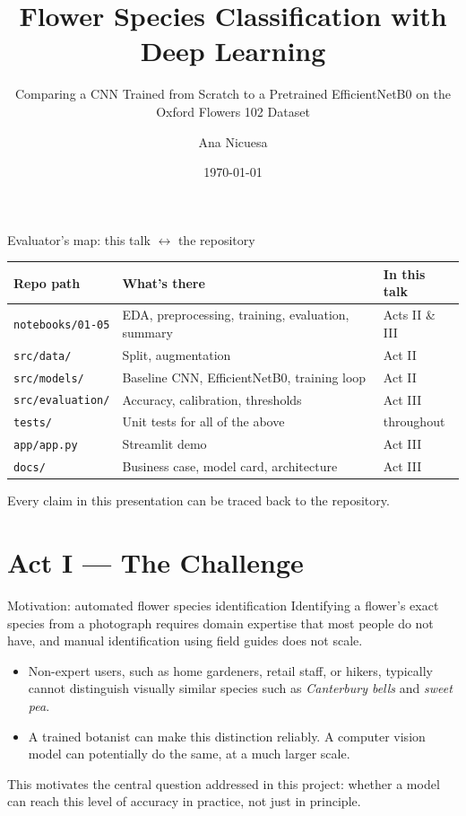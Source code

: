 \documentclass[aspectratio=169]{beamer}
\title{Flower Species Classification with Deep Learning}
\subtitle{Comparing a CNN Trained from Scratch to a Pretrained EfficientNetB0 on the Oxford Flowers 102 Dataset}
\author{Ana Nicuesa}
\date{\today}
\begin{document}
\maketitle

\begin{frame}{Evaluator's map: this talk $\leftrightarrow$ the repository}
\small
\begin{tabular}{p{2.9cm}p{4.6cm}p{3.3cm}}
\toprule
\textbf{Repo path} & \textbf{What's there} & \textbf{In this talk} \\
\midrule
\texttt{notebooks/01-05} & EDA, preprocessing, training, evaluation, summary & Acts II \& III \\
\texttt{src/data/} & Split, augmentation & Act II \\
\texttt{src/models/} & Baseline CNN, EfficientNetB0, training loop & Act II \\
\texttt{src/evaluation/} & Accuracy, calibration, thresholds & Act III \\
\texttt{tests/} & Unit tests for all of the above & throughout \\
\texttt{app/app.py} & Streamlit demo & Act III \\
\texttt{docs/} & Business case, model card, architecture & Act III \\
\bottomrule
\end{tabular}

\vspace{0.8em}
Every claim in this presentation can be traced back to the repository.
\end{frame}

\section{Act I --- The Challenge}

\begin{frame}{Motivation: automated flower species identification}
Identifying a flower's exact species from a photograph requires domain
expertise that most people do not have, and manual identification using
field guides does not scale.

\vspace{1em}
\begin{itemize}
  \item Non-expert users, such as home gardeners, retail staff, or hikers,
    typically cannot distinguish visually similar species such as
    \emph{Canterbury bells} and \emph{sweet pea}.
  \item A trained botanist can make this distinction reliably. A computer
    vision model can potentially do the same, at a much larger scale.
\end{itemize}

\vspace{1em}
This motivates the central question addressed in this project: whether a
model can reach this level of accuracy in practice, not just in principle.
\end{frame}
\end{document}
